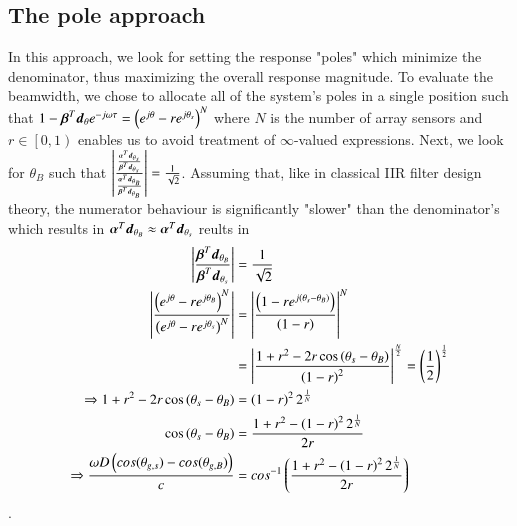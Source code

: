 \subsection{The pole approach}
In this approach, we look for setting the response "poles" which minimize the denominator, thus maximizing the overall response magnitude. To evaluate the beamwidth, we chose to allocate all of the system's poles in a single position such that 
$
1-\boldsymbol{\beta}^{T}\boldsymbol{d}_{\theta}e^{-j\omega\tau}
=
\left(e^{j\theta}-re^{j\theta_{s}}\right)^{N}
$
where $N$ is the number of array sensors and $r \in \left[0,1\right)$ enables us to avoid treatment of $\infty$-valued expressions. Next, we look for $\theta_{B}$ such that
$
\left|\frac{
\frac
{
\boldsymbol{\alpha}^{T}\boldsymbol{d}_{\theta_{s}}
}{
\boldsymbol{\beta}^{T}\boldsymbol{d}_{\theta_{s}}
}
}{
\frac
{
\boldsymbol{\alpha}^{T}\boldsymbol{d}_{\theta_{B}}
}{
\boldsymbol{\beta}^{T}\boldsymbol{d}_{\theta_{B}}
}
}\right|
= \frac{1}{\sqrt{2}}
$. Assuming that, like in classical IIR filter design theory, the numerator behaviour is significantly "slower" than the denominator's which results in $\boldsymbol{\alpha}^{T}\boldsymbol{d}_{\theta_{B}} 
\approx
\boldsymbol{\alpha}^{T}\boldsymbol{d}_{\theta_{s}}$ reults in
\begin{align*}
    \left|\frac{
    \boldsymbol{\beta}^{T}\boldsymbol{d}_{\theta_{B}}
    }{
    \boldsymbol{\beta}^{T}\boldsymbol{d}_{\theta_{s}}
    }\right|
    &= \frac{1}{\sqrt{2}}
    \\
    \left|
    \frac{
    \left(e^{j\theta}-re^{j\theta_{B}}\right)^{N}
    }{
    \left(e^{j\theta}-re^{j\theta_{s}}\right)^{N}
    }
    \right|
    &=
    \left|
    \frac{
    \left(1-re^{j\left(\theta_{s}-\theta_{B}\right)}\right)
    }{
    \left(1-r\right)
    }
    \right|^{N}
    \\
    &=
    \left|
    \frac{
    1+r^{2}-2r\cos{\left(\theta_{s}-\theta_{B}\right)}
    }{
    \left(1-r\right)^{2}
    }
    \right|^{\frac{N}{2}}
    =
    \left(\frac{1}{2}\right)^{\frac{1}{2}}
    \\
    \Rightarrow 
    1+r^{2}-2r\cos{\left(\theta_{s}-\theta_{B}\right)}
    &=
    \left(1-r\right)^{2}2^{\frac{1}{N}}
    \\
    \cos{\left(\theta_{s}-\theta_{B}\right)}
    &=
    \frac{
    1+r^{2}-\left(1-r\right)^{2}2^{\frac{1}{N}}
    }{
    2r
    }
    \\
    \Rightarrow
    \frac{\omega{D\left(cos(\theta_{g,s})-cos(\theta_{g,B})\right)}}{c}
    &=
    cos^{-1}
    \left(
    \frac{1+r^{2}-\left(1-r\right)^{2}2^{\frac{1}{N}}}{2r}
    \right)
\end{align*}.
